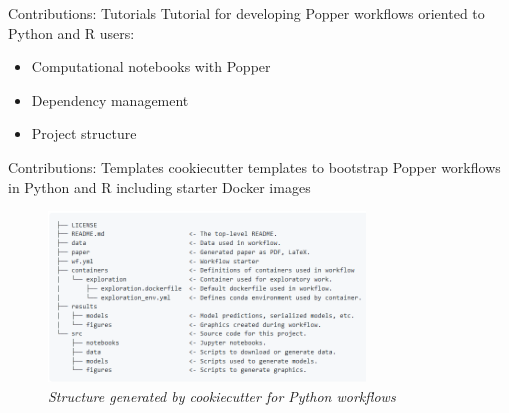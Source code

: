 \documentclass[10pt]{beamer}
\begin{document}
\begin{frame}{Contributions: Tutorials}
    Tutorial for developing Popper workflows oriented to Python and R users:
    \begin{itemize}
        \item Computational notebooks with Popper 
        \item Dependency management
        \item Project structure
    \end{itemize}
\end{frame}

\begin{frame}{Contributions: Templates}
    \alert{cookiecutter} templates to bootstrap Popper workflows in Python and R
    including starter Docker images
    \begin{center}
        \begin{figure}
            \includegraphics[width=0.75\textwidth]{images/project_structure.png}
            \caption*{{\sl Structure generated by cookiecutter for Python workflows}}
        \end{figure}
    \end{center}
\end{frame}
\end{document}
